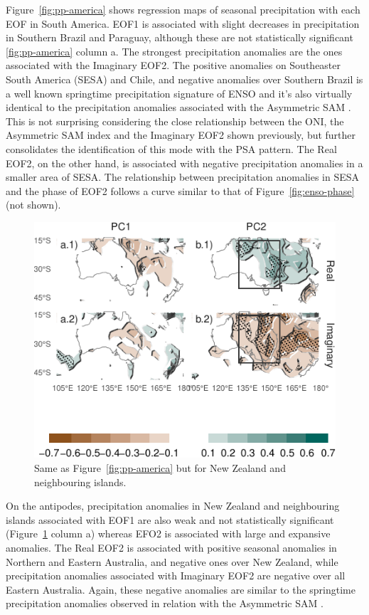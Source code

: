 \documentclass[smallextended]{svjour3}       %
\begin{document}
Figure~\ref{fig:pp-america} shows regression maps of seasonal precipitation with each EOF in South America. EOF1 is associated with slight decreases in precipitation in Southern Brazil and Paraguay, although these are not statistically significant \ref{fig:pp-america} column a. The strongest precipitation anomalies are the ones associated with the Imaginary EOF2. The positive anomalies on Southeaster South America (SESA) and Chile, and negative anomalies over Southern Brazil is a well known springtime precipitation signature of ENSO \citep{cai2020a} and it's also virtually identical to the precipitation anomalies associated with the Asymmetric SAM \citep{campitelli2021}. This is not surprising considering the close relationship between the ONI, the Asymmetric SAM index and the Imaginary EOF2 shown previously, but further consolidates the identification of this mode with the PSA pattern. The Real EOF2, on the other hand, is associated with negative precipitation anomalies in a smaller area of SESA. The relationship between precipitation anomalies in SESA and the phase of EOF2 follows a curve similar to that of Figure~\ref{fig:enso-phase} (not shown).



\begin{figure}
\centering
\includegraphics{../figures/pp-oceania-1.pdf}
\caption{\label{fig:pp-oceania}Same as Figure~\ref{fig:pp-america} but for New Zealand and neighbouring islands.}
\end{figure}

On the antipodes, precipitation anomalies in New Zealand and neighbouring islands associated with EOF1 are also weak and not statistically significant (Figure~\ref{fig:pp-oceania} column a) whereas EFO2 is associated with large and expansive anomalies. The Real EOF2 is associated with positive seasonal anomalies in Northern and Eastern Australia, and negative ones over New Zealand, while precipitation anomalies associated with Imaginary EOF2 are negative over all Eastern Australia. Again, these negative anomalies are similar to the springtime precipitation anomalies observed in relation with the Asymmetric SAM \citep{campitelli2021}.
\end{document}
